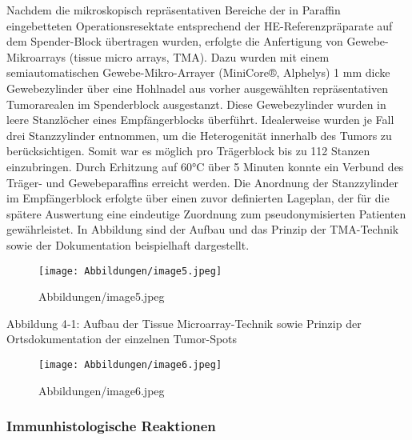 Nachdem die mikroskopisch repräsentativen Bereiche der in Paraffin eingebetteten Operationsresektate entsprechend der HE-Referenzpräparate auf dem Spender-Block übertragen wurden, erfolgte die Anfertigung von Gewebe-Mikroarrays (tissue micro arrays, TMA). Dazu wurden mit einem semiautomatischen Gewebe-Mikro-Arrayer (MiniCore®, Alphelys) 1 mm dicke Gewebezylinder über eine Hohlnadel aus vorher ausgewählten repräsentativen Tumorarealen im Spenderblock ausgestanzt. Diese Gewebezylinder wurden in leere Stanzlöcher eines Empfängerblocks überführt. Idealerweise wurden je Fall drei Stanzzylinder entnommen, um die Heterogenität innerhalb des Tumors zu berücksichtigen. Somit war es möglich pro Trägerblock bis zu 112 Stanzen einzubringen. Durch Erhitzung auf 60°C über 5 Minuten konnte ein Verbund des Träger- und Gewebeparaffins erreicht werden. Die Anordnung der Stanzzylinder im Empfängerblock erfolgte über einen zuvor definierten Lageplan, der für die spätere Auswertung eine eindeutige Zuordnung zum pseudonymisierten Patienten gewährleistet. In Abbildung sind der Aufbau und das Prinzip der TMA-Technik sowie der Dokumentation beispielhaft dargestellt.

\begin{fignos:no-prefix-figure-caption}

\begin{figure}
\centering
\texttt{[image: Abbildungen/image5.jpeg]}
\caption{Abbildungen/image5.jpeg}
\end{figure}

\end{fignos:no-prefix-figure-caption}

Abbildung 4‑1: Aufbau der Tissue Microarray-Technik sowie Prinzip der Ortsdokumentation der einzelnen Tumor-Spots

\begin{fignos:no-prefix-figure-caption}

\begin{figure}
\centering
\texttt{[image: Abbildungen/image6.jpeg]}
\caption{Abbildungen/image6.jpeg}
\end{figure}

\end{fignos:no-prefix-figure-caption}

\hypertarget{immunhistologische-reaktionen}{%
\subsubsection{Immunhistologische Reaktionen}\label{immunhistologische-reaktionen}}

